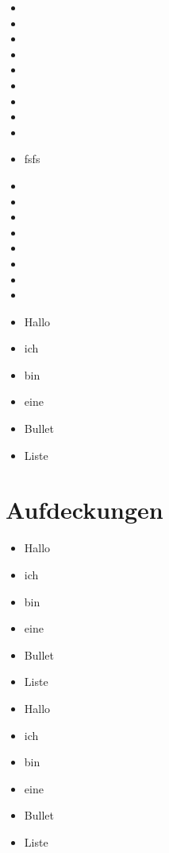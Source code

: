 \documentclass[ngerman]{beamer}
\begin{document}
\begin{frame}[allowframebreaks] %

\begin{itemize}
	\item 
	\item 
	\item 
	\item 
	\item 
	\item 
	\item 
	\item 
	\item 
	\item fsfs \newpage 
	\item 
	\item 
	\item 
	\item 
	\item 
	\item 
	\item 
	\item 
\end{itemize}

\end{frame}



\begin{frame}

\begin{itemize}
	\item Hallo \pause
	\item ich \pause
	\item bin  \pause
	\item eine \pause 
	\item Bullet
	\item Liste
\end{itemize}

\end{frame}

\section{Aufdeckungen}

\begin{frame}

\begin{itemize}
	\item<1-> Hallo 
	\item<2> ich 
	\item<-2> bin  
	\item<3-> eine 
	\item<1> Bullet
	\item<2> Liste
\end{itemize}

\end{frame}


\begin{frame}

\begin{itemize}
	\item<1-> Hallo 
	\item<2-> ich 
	\item<3-> bin  
	\item<4-> eine 
	\item<5-> Bullet
	\item<6-> Liste
\end{itemize}

\end{frame}
\end{document}
